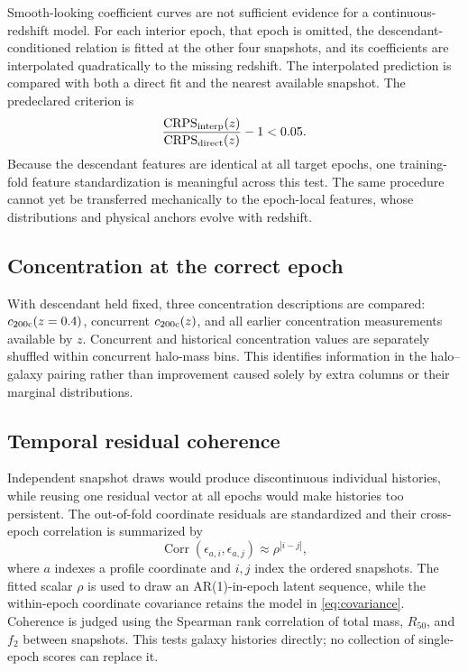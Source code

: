 Smooth-looking coefficient curves are not sufficient evidence for a
continuous-redshift model. For each interior epoch, that epoch is omitted, the
descendant-conditioned relation is fitted at the other four snapshots, and its
coefficients are interpolated quadratically to the missing redshift. The
interpolated prediction is compared with both a direct fit and the nearest
available snapshot. The predeclared criterion is
\begin{equation}
  \frac{\mathrm{CRPS}_{\rm interp}(z)}
       {\mathrm{CRPS}_{\rm direct}(z)}-1 < 0.05.
  \label{eq:closure_gate}
\end{equation}
Because the descendant features are identical at all target epochs, one
training-fold feature standardization is meaningful across this test. The same
procedure cannot yet be transferred mechanically to the epoch-local features,
whose distributions and physical anchors evolve with redshift.

\subsection{Concentration at the correct epoch}

With descendant \diffmah{} held fixed, three concentration descriptions are
compared: $c_{200\mathrm{c}}(z=0.4)$, concurrent $c_{200\mathrm{c}}(z)$, and all earlier concentration
measurements available by $z$. Concurrent and historical concentration values
are separately shuffled within concurrent halo-mass bins. This identifies
information in the halo--galaxy pairing rather than improvement caused solely
by extra columns or their marginal distributions.

\subsection{Temporal residual coherence}
\label{sec:ar1}

Independent snapshot draws would produce discontinuous individual histories,
while reusing one residual vector at all epochs would make histories too
persistent. The out-of-fold coordinate residuals are standardized and their
cross-epoch correlation is summarized by
\begin{equation}
  \operatorname{Corr}(\epsilon_{a,i},\epsilon_{a,j})
  \approx \rho^{|i-j|},
  \label{eq:ar1}
\end{equation}
where $a$ indexes a profile coordinate and $i,j$ index the ordered snapshots.
The fitted scalar $\rho$ is used to draw an AR(1)-in-epoch latent sequence, while
the within-epoch coordinate covariance retains the model in
\cref{eq:covariance}. Coherence is judged using the Spearman rank correlation
of total mass, $R_{50}$, and $f_2$ between snapshots. This tests galaxy histories
directly; no collection of single-epoch scores can replace it.

